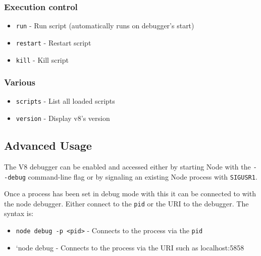 \subsubsection{Execution control}

\begin{itemize}
\item
  \texttt{run} - Run script (automatically runs on debugger's start)
\item
  \texttt{restart} - Restart script
\item
  \texttt{kill} - Kill script
\end{itemize}

\subsubsection{Various}

\begin{itemize}
\item
  \texttt{scripts} - List all loaded scripts
\item
  \texttt{version} - Display v8's version
\end{itemize}

\subsection{Advanced Usage}

The V8 debugger can be enabled and accessed either by starting Node with
the \texttt{-{}-debug} command-line flag or by signaling an existing
Node process with \texttt{SIGUSR1}.

Once a process has been set in debug mode with this it can be connected
to with the node debugger. Either connect to the \texttt{pid} or the URI
to the debugger. The syntax is:

\begin{itemize}
\item
  \texttt{node debug -p \textless{}pid\textgreater{}} - Connects to the
  process via the \texttt{pid}
\item
  `node debug - Connects to the process via the URI such as
  localhost:5858
\end{itemize}
